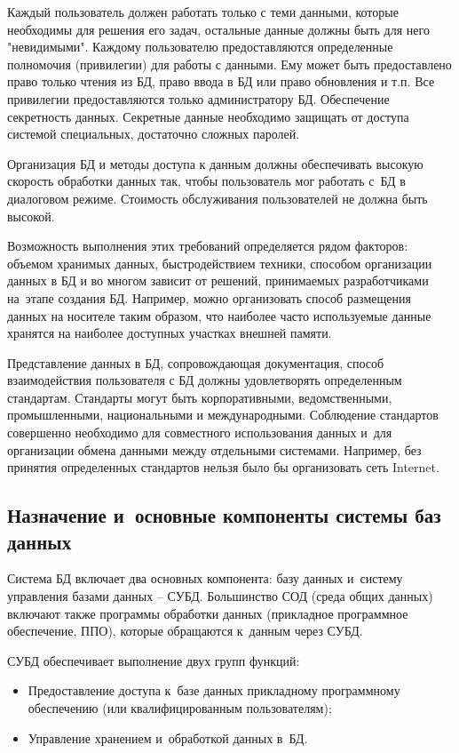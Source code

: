 \documentclass{ou}
\begin{document}
Каждый пользователь должен работать только с теми данными, которые необходимы для решения его задач, остальные данные должны быть для него "невидимыми". Каждому пользователю предоставляются определенные полномочия (привилегии) для работы с данными. Ему может быть предоставлено право только чтения из БД, право ввода в БД или право обновления и т.п. Все привилегии предоставляются только администратору БД. Обеспечение секретность данных. Секретные данные необходимо защищать от доступа системой специальных, достаточно сложных паролей. 

Организация БД и методы доступа к данным должны обеспечивать высокую скорость обработки данных так, чтобы пользователь мог работать с~БД в диалоговом режиме. Стоимость обслуживания пользователей не должна быть высокой\cite{Elmudurov2023}.

Возможность выполнения этих требований определяется рядом факторов: объемом хранимых данных, быстродействием техники, способом организации данных в БД и во многом зависит от решений, принимаемых разработчиками на~этапе создания БД. Например, можно организовать способ размещения данных на носителе таким образом, что наиболее часто используемые данные хранятся на наиболее доступных участках внешней памяти.

Представление данных в БД, сопровождающая документация, способ взаимодействия пользователя с БД должны удовлетворять определенным стандартам. Стандарты могут быть корпоративными, ведомственными, промышленными, национальными и международными. Соблюдение стандартов совершенно необходимо для совместного использования данных и~для организации обмена данными между отдельными системами. Например, без принятия определенных стандартов нельзя было бы организовать сеть Internet\cite{Karpova2013}.

\subsection{Назначение и~основные компоненты системы баз данных}
Система БД включает два основных компонента: базу данных и~систему управления базами данных -- СУБД. Большинство СОД (среда общих данных) включают также программы обработки данных (прикладное программное обеспечение, ППО), которые обращаются к~данным через СУБД\cite{Sergeev2012}.

СУБД обеспечивает выполнение двух групп функций:
\begin{itemize}[label=-, leftmargin=0em, itemindent=3.35em, nosep]
\item Предоставление доступа к~базе данных прикладному программному обеспечению (или квалифицированным пользователям);
\item Управление хранением и~обработкой данных в~БД.
\end{itemize}
\end{document}
